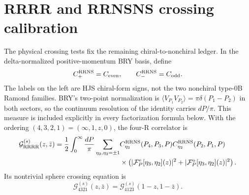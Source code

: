 \documentclass[11pt]{article}
\newcommand{\NS}{\mathrm{NS}}
\newcommand{\R}{\mathrm{R}}
\newcommand{\F}{\mathcal F}
\begin{document}
\section{RRRR and RRNSNS crossing calibration}
\label{sec:ramond-crossing}

The physical crossing tests fix the remaining chiral-to-nonchiral ledger.
In the delta-normalized positive-momentum BRY basis, define
\begin{equation}
 C_{+}^{\R\R\NS}=C_{\rm even},\qquad
 C_{-}^{\R\R\NS}=C_{\rm odd}.
 \label{eq:hjs-bry-chiral-map}
\end{equation}
The labels on the left are HJS chiral-form signs, not the two nonchiral
type-0B Ramond families.  BRY's two-point normalization is
$\langle V_{P_1}V_{P_2}\rangle=\pi\delta(P_1-P_2)$ in both sectors, so the
continuum resolution of the identity carries $dP/\pi$.  This measure is
included explicitly in every factorization formula below.  With the ordering
$(4,3,2,1)=(\infty,1,z,0)$,
the four-R correlator is
\begin{equation}
 \begin{aligned}
 \mathcal G_{\R\R\R\R}^{(s)}(z,\bar z)
 =\frac12\int_0^\infty \frac{dP}{\pi}
 \sum_{\eta_3,\eta_2=\pm1}
 &C_{\eta_3}^{\R\R\NS}(P_4,P_3,P)
  C_{\eta_2}^{\R\R\NS}(P_2,P_1,P)
 \\
 &\times\left(
 |\F^{\rm e}_{P}[\eta_3,\eta_2](z)|^2
 +|\F^{\rm o}_{P}[\eta_3,\eta_2](z)|^2\right).
 \end{aligned}
 \label{eq:rrrr-full-correlator}
\end{equation}
Its nontrivial sphere crossing equation is
\begin{equation}
 \mathcal G_{4321}^{(s)}(z,\bar z)
 =\mathcal G_{4123}^{(s)}(1-z,1-\bar z).
 \label{eq:rrrr-crossing}
\end{equation}
\end{document}

